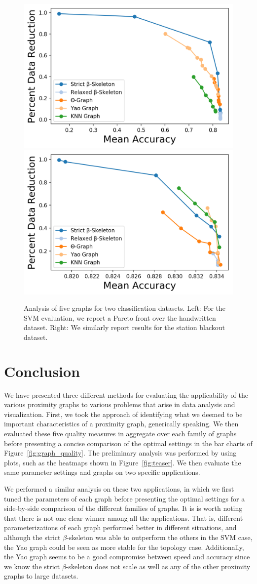 \begin{figure}[t]
    \centering
    \includegraphics[width=0.48\linewidth]{figs/chap7/pareto_letters.png}
    \includegraphics[width=0.48\linewidth]{figs/chap7/pareto_sbo.png}
    \caption[Trade-off analysis of graphs for SVM classification]{Analysis of five graphs for two classification datasets.
    Left: For the SVM evaluation, we report a Pareto front over the handwritten dataset.
    Right: We similarly report results for the station blackout dataset.}
    \label{fig:graph_svm}
\end{figure}

\section{Conclusion}
We have presented three different methods for evaluating the applicability of the various proximity graphs to various problems that arise in data analysis and visualization.
%
First, we took the approach of identifying what we deemed to be important characteristics of a proximity graph, generically speaking.
%
We then evaluated these five quality measures in aggregate over each family of graphs before presenting a concise comparison of the optimal settings in the bar charts of Figure~\ref{fig:graph_quality}.
%
The preliminary analysis was performed by using plots, such as the heatmaps shown in Figure~\ref{fig:teaser}.
%
We then evaluate the same parameter settings and graphs on two specific applications.

We performed a similar analysis on these two applications, in which we first tuned the parameters of each graph before presenting the optimal settings for a side-by-side comparison of the different families of graphs.
%
It is is worth noting that there is not one clear winner among all the applications.
%
That is, different parameterizations of each graph performed better in different situations, and although the strict $\beta$-skeleton was able to outperform the others in the SVM case, the Yao graph could be seen as more stable for the topology case.
%
Additionally, the Yao graph seems to be a good compromise between speed and accuracy since we know the strict $\beta$-skeleton does not scale as well as any of the other proximity graphs to large datasets.

